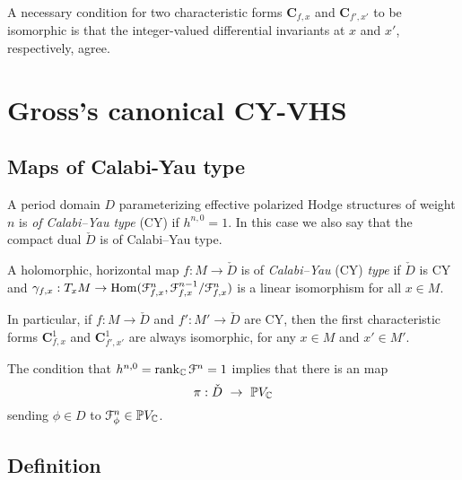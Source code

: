 \documentclass[12pt]{amsart}
\numberwithin{equation}{section}
\numberwithin{table}{section}
\numberwithin{figure}{section}
\begin{document}
A necessary condition for two characteristic forms $\mathbf{C}_{f,x}$ and $\mathbf{C}_{f',x'}$ to be isomorphic is that the integer-valued differential invariants at $x$ and $x'$, respectively, agree.


\section{Gross's canonical CY-VHS} \label{S:gross}

\subsection{Maps of Calabi-Yau type} \label{S:CY}

A period domain $D$ parameterizing effective polarized Hodge structures of weight $n$ is \emph{of Calabi--Yau type} (CY) if $h^{n,0} = 1$.  In this case we also say that the compact dual $\check D$ is of Calabi--Yau type.

A holomorphic, horizontal map $f : M \to \check D$ is of \emph{Calabi--Yau} (CY) \emph{type} if $\check D$ is CY and $\gamma_{f,x} : T_xM \to \mathrm{Hom}(\mathcal F^n_{f,x} , \mathcal F^{n-1}_{f,x}/\mathcal F^n_{f,x})$ is a linear isomorphism for all $x \in M$.

\begin{remark} \label{R:C1}
In particular, if $f : M \to \check D$ and $f': M' \to \check D$ are CY, then the first characteristic forms $\mathbf{C}^1_{f,x}$ and $\mathbf{C}^1_{f',x'}$ are always isomorphic, for any $x \in M$ and $x'\in M'$.
\end{remark}

The condition that $h^{n,0} = \mathrm{rank}_\mathbb C\,\mathcal F^n = 1$ implies that there is an map
\[
  \pi : \check D \ \to \ \mathbb P V_\mathbb C
\]
sending $\phi \in D$ to $\mathcal F^n_\phi \in \mathbb P V_\mathbb C$.

\subsection{Definition} 
\end{document}
